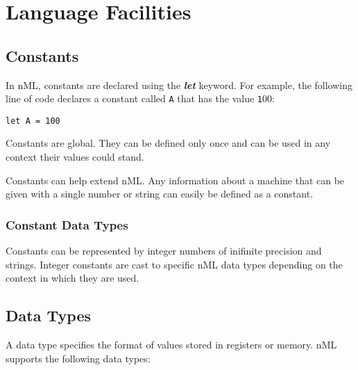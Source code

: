 \chapter{Language Facilities}


\section{Constants}

In nML, constants are declared using the \textbf{\textit{let}} keyword. For example,
the following line of code declares a constant called {\texttt A} that has the value {\texttt 100}:

\begin{lstlisting}
let A = 100
\end{lstlisting}

Constants are global. They can be defined only once and can be used in any context
their values could stand.

Constants can help extend nML. Any information about a machine that can be given with
a single number or string can easily be defined as a constant.

\subsection{Constant Data Types}

Constants can be represented by integer numbers of inifinite precision and strings.
Integer constants are cast to specific nML data types depending on the context in
which they are used.


\section{Data Types}

A data type specifies the format of values stored in registers or memory.
nML supports the following data types:

